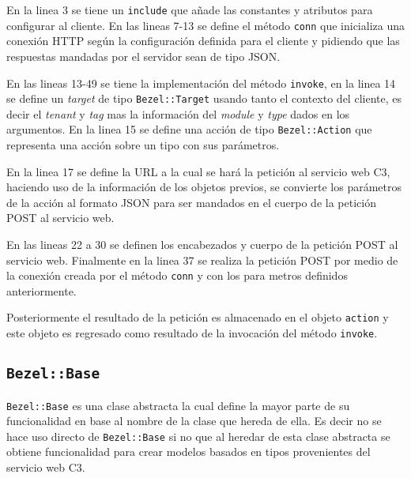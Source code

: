 

En la linea 3 se tiene un \texttt{include} que añade las constantes
y atributos para configurar al cliente. En las lineas 7-13 se define el método
\texttt{conn} que inicializa una conexión HTTP según la configuración definida
para el cliente y pidiendo que las respuestas mandadas por el servidor
sean de tipo JSON. 

En las lineas 13-49 se tiene la implementación del método \texttt{invoke}, en 
la linea 14 se define un \textit{target} de tipo \texttt{Bezel::Target} usando 
tanto el contexto del cliente, es decir el \textit{tenant} y \textit{tag} mas 
la información del \textit{module} y \textit{type} dados en los argumentos.
En la linea 15 se define una acción de tipo \texttt{Bezel::Action} que representa
una acción sobre un tipo con sus parámetros.

En la linea 17 se define la URL a la cual se hará la petición al servicio web C3,
haciendo uso de la información de los objetos previos, se convierte los parámetros
de la acción al formato JSON para ser mandados en el cuerpo de la petición POST
al servicio web.


En las lineas 22 a 30 se definen los encabezados y cuerpo de la petición POST al
servicio web. Finalmente en la linea 37 se realiza la petición POST por medio
de la conexión creada por el método \texttt{conn} y con los para metros definidos
anteriormente.

Posteriormente el resultado de la petición es almacenado en el objeto \texttt{action}
y este objeto es regresado como resultado de la invocación del método
\texttt{invoke}.

\subsection{\texttt{Bezel::Base}}

\texttt{Bezel::Base} es una clase abstracta la cual define la mayor parte de su
funcionalidad en base al nombre de la clase que hereda de ella. Es decir no se hace
uso directo de \texttt{Bezel::Base} si no que al heredar de esta clase abstracta
se obtiene funcionalidad para crear modelos basados en tipos provenientes
del servicio web C3.




